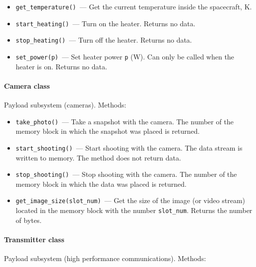 \documentclass[12pt,a4paper]{article}
\begin{document}
\begin{itemize}
\item \verb'get_temperature()'~--- Get the current temperature inside the spacecraft, K.
\item \verb'start_heating()'~--- Turn on the heater. Returns no data.
\item \verb'stop_heating()'~--- Turn off the heater. Returns no data.
\item \verb'set_power(p)'~--- Set heater power \verb'p' (W). Can only be called when the heater is on. Returns no data.
\end{itemize}

\paragraph{Camera class}

Payload subsystem (cameras). Methods:

\begin{itemize}
\item \verb'take_photo()'~--- Take a snapshot with the camera. The number of the memory block in which the snapshot was placed is returned.
\item \verb'start_shooting()'~--- Start shooting with the camera. The data stream is written to memory. The method does not return data.
\item \verb'stop_shooting()'~--- Stop shooting with the camera. The number of the memory block in which the data was placed is returned.
\item \verb'get_image_size(slot_num)'~--- Get the size of the image (or video stream) located in the memory block with the number \verb'slot_num'. Returns the number of bytes.
\end{itemize}

\paragraph{Transmitter class}

Payload subsystem (high performance communications). Methods:
\end{document}
